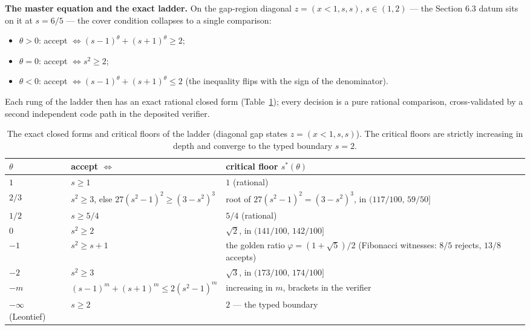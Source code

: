 \documentclass[3p,11pt]{elsarticle}
\providecommand{\tightlist}{\setlength{\itemsep}{0pt}\setlength{\parskip}{0pt}}
\begin{document}
\textbf{The master equation and the exact ladder.} On the gap-region
diagonal \(z = (x < 1, s, s)\), \(s \in (1, 2)\) --- the Section 6.3
datum sits on it at \(s = 6/5\) --- the cover condition collapses to a
single comparison:

\begin{itemize}
\tightlist
\item
  \(\theta > 0\): accept \(\iff (s-1)^\theta + (s+1)^\theta \ge 2\);
\item
  \(\theta = 0\): accept \(\iff s^2 \ge 2\);
\item
  \(\theta < 0\): accept \(\iff (s-1)^\theta + (s+1)^\theta \le 2\)
  (the inequality flips with the sign of the denominator).
\end{itemize}

Each rung of the ladder then has an exact rational closed form
(Table~\ref{tab:sigmaladder}); every decision is a pure rational
comparison, cross-validated by a second independent code path in the
deposited verifier.

\begin{table}[htbp]
\centering
\small
\caption{The exact closed forms and critical floors of the ladder
(diagonal gap states \(z = (x < 1, s, s)\)). The critical floors are
strictly increasing in depth and converge to the typed boundary \(s = 2\).}
\label{tab:sigmaladder}
\begin{tabular}{@{}lp{4.6cm}p{4.9cm}@{}}
\toprule
\(\theta\) & accept \(\iff\) & critical floor \(s^*(\theta)\) \\
\midrule
\(1\) & \(s \ge 1\) & \(1\) (rational) \\
\(2/3\) & \(s^2 \ge 3\), else \(27(s^2-1)^2 \ge (3-s^2)^3\) & root of \(27(s^2-1)^2 = (3-s^2)^3\), in \((117/100,\, 59/50]\) \\
\(1/2\) & \(s \ge 5/4\) & \(5/4\) (rational) \\
\(0\) & \(s^2 \ge 2\) & \(\sqrt{2}\), in \((141/100,\, 142/100]\) \\
\(-1\) & \(s^2 \ge s + 1\) & the golden ratio \(\varphi = (1+\sqrt{5})/2\) (Fibonacci witnesses: \(8/5\) rejects, \(13/8\) accepts) \\
\(-2\) & \(s^2 \ge 3\) & \(\sqrt{3}\), in \((173/100,\, 174/100]\) \\
\(-m\) & \((s-1)^m + (s+1)^m \le 2(s^2-1)^m\) & increasing in \(m\), brackets in the verifier \\
\(-\infty\) (Leontief) & \(s \ge 2\) & \(2\) --- the typed boundary \\
\bottomrule
\end{tabular}
\end{table}
\end{document}
